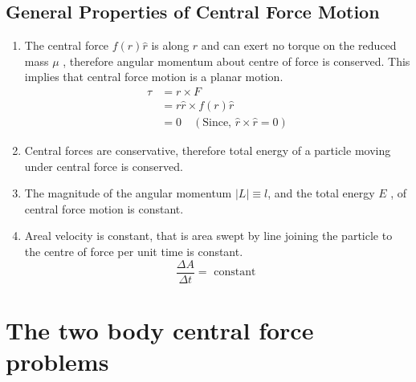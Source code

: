 \subsection{General Properties of Central Force Motion}
\begin{enumerate}
	
	\item The central force $f(r) \hat{{r}}$ is along ${r}$ and can exert no torque on the reduced mass $\mu $ , therefore angular momentum about centre of force is conserved. This implies that central force motion is a planar motion. 
	\begin{align*}
	\tau &=r\times F\\
	&=r  \hat{r} \times f(r) \hat{{r}}\\
	&=0 \quad (\text{Since,  } \hat{r} \times \hat{r} =0)
	\end{align*}
	\item Central forces are conservative, therefore total energy of a particle moving under central force is conserved.
	\item The magnitude of the angular momentum $|{L}| \equiv l$, and the total energy $E $ , of central force motion is constant.
	\item Areal velocity is constant, that is area swept by line joining the particle to the centre of force per unit time is constant.
	\begin{equation}
	\frac{\Delta A}{\Delta t}=\text { constant }
	\end{equation}
\end{enumerate}
\section{The two body central force problems}
